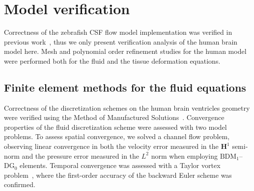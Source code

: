 \documentclass{template}
\begin{document}


\section{Model verification}
Correctness of the zebrafish CSF flow model implementation
was verified in previous work~\citep{Herlyng2025AdvectionDiffusion},
thus we only present verification analysis of the human brain model here.
Mesh and polynomial order refinement studies for the human
model were performed both for the fluid and the tissue deformation equations.

\subsection{Finite element methods for the fluid equations}
Correctness of the discretization schemes on the human brain ventricles geometry
were verified using the Method of Manufactured Solutions~\citep{Roache2001CodeSolutions}.
Convergence properties of the fluid discretization scheme were assessed with two
model problems. To assess spatial convergence, we solved a channel flow
problem, observing linear convergence in both the velocity error measured
in the $\bm{H}^1$ semi-norm and the pressure error measured in the $L^2$ norm
when employing $\mathrm{BDM}_1$--$\mathrm{DG}_0$ elements.
Temporal convergence was assessed with a Taylor vortex
problem~\citep{Karniadakis2005Verification}, where the first-order
accuracy of the backward Euler scheme was confirmed.
\end{document}
